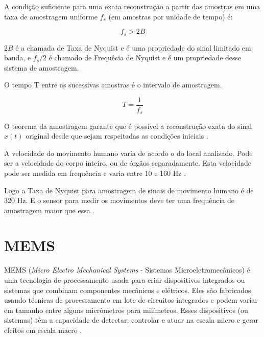 A condição suficiente para uma exata reconstrução a partir das amostras em uma taxa de amostragem uniforme $ f_{s} $ (em amostras por unidade de tempo) é:

\begin{equation}
f_{s}>2B 
\end{equation}

$2B$ é a chamada de Taxa de Nyquist e é uma propriedade do sinal limitado em banda, e $f_{s}/2$ é chamado de Frequêcia de Nyquist e é um propriedade desse sistema de amostragem.

O tempo T entre as sucessivas amostras é o intervalo de amostragem.

\begin{equation}
T=\frac{1}{f_{s}}
\end{equation}

O teorema da amostragem garante que é possível a reconstrução exata do sinal $ x(t) $ original desde que sejam respeitadas as condições iniciais \cite{willsky2010}.

A velocidade do movimento humano varia de  acordo o do local analisado. Pode ser a velocidade do corpo inteiro, ou de órgãos separadamente. Esta velocidade pode ser medida em frequência e varia entre 10 e 160 Hz \cite{song2016}.

Logo a Taxa de Nyquist para amostragem de sinais de movimento humano é de 320 Hz. E o sensor para medir os movimentos deve ter uma frequência de amostragem maior que essa \cite{song2016}. 


	\section{MEMS}

		MEMS (\textit{Micro Electro Mechanical Systems} - Sistemas Microeletromecânicos) é uma tecnologia de processamento usada para criar dispositivos integrados ou sistemas que combinam componentes mecânicos e elétricos. Eles são fabricados usando técnicas de processamento em lote de circuitos integrados e podem variar em tamanho entre alguns micrômetros para milímetros. Esses dispositivos (ou sistemas) têm a capacidade de detectar, controlar e atuar na escala micro e gerar efeitos em escala macro \cite{prime2002}. 

